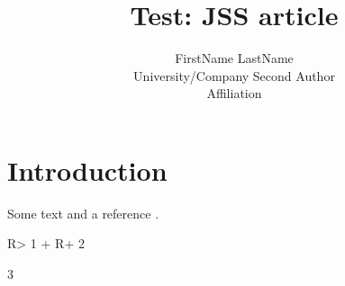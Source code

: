 \documentclass[article,nojss]{jss}
\author{
FirstName LastName\\University/Company \And Second Author\\Affiliation
}
\title{Test: JSS article}
\begin{document}
\hypertarget{introduction}{%
\section{Introduction}\label{introduction}}

Some text and a reference \citep{JSSv059i10}.

\begin{CodeChunk}

\begin{CodeInput}
R> 1 +
R+   2
\end{CodeInput}

\begin{CodeOutput}
[1] 3
\end{CodeOutput}
\end{CodeChunk}


\end{document}
